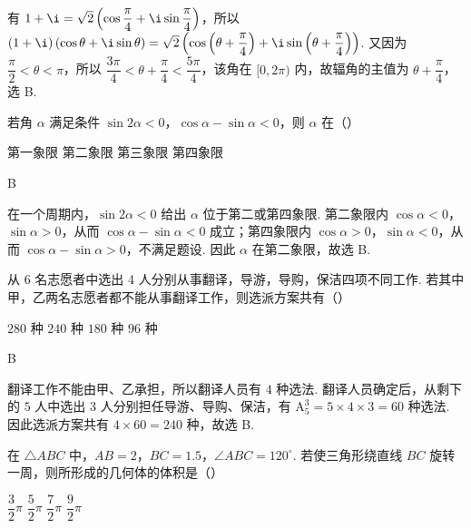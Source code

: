 \begin{solution}
有 \(1+\i=\sqrt{2}\left(\cos\dfrac{\pi}{4}+\i\sin\dfrac{\pi}{4}\right)\)，所以
\(\left(1+\i\right)\left(\cos\theta+\i\sin\theta\right)=\sqrt{2}\left(\cos\left(\theta+\dfrac{\pi}{4}\right)+\i\sin\left(\theta+\dfrac{\pi}{4}\right)\right)\).
又因为 \(\dfrac{\pi}{2}<\theta<\pi\)，所以 \(\dfrac{3\pi}{4}<\theta+\dfrac{\pi}{4}<\dfrac{5\pi}{4}\)，该角在 \([0,2\pi)\) 内，故辐角的主值为 \(\theta+\dfrac{\pi}{4}\)，选 B.
\end{solution}

\begin{problem}
若角 \(\alpha\) 满足条件 \(\sin2\alpha<0\)，\(\cos\alpha-\sin\alpha<0\)，则 \(\alpha\) 在（\quad）

\choices
    {第一象限}
    {第二象限}
    {第三象限}
    {第四象限}
\end{problem}

\begin{answer}
B
\end{answer}

\begin{solution}
在一个周期内，\(\sin2\alpha<0\) 给出 \(\alpha\) 位于第二或第四象限. 第二象限内 \(\cos\alpha<0\)，\(\sin\alpha>0\)，从而 \(\cos\alpha-\sin\alpha<0\) 成立；第四象限内 \(\cos\alpha>0\)，\(\sin\alpha<0\)，从而 \(\cos\alpha-\sin\alpha>0\)，不满足题设. 因此 \(\alpha\) 在第二象限，故选 B.
\end{solution}

\begin{problem}
从 6 名志愿者中选出 4 人分别从事翻译，导游，导购，保洁四项不同工作. 若其中甲，乙两名志愿者都不能从事翻译工作，则选派方案共有（\quad）

\choices
    {\(280\text{ 种}\)}
    {\(240\text{ 种}\)}
    {\(180\text{ 种}\)}
    {\(96\text{ 种}\)}
\end{problem}

\begin{answer}
B
\end{answer}

\begin{solution}
翻译工作不能由甲、乙承担，所以翻译人员有 \(4\) 种选法. 翻译人员确定后，从剩下的 \(5\) 人中选出 \(3\) 人分别担任导游、导购、保洁，有 \(\mathrm A_{5}^{3}=5\times4\times3=60\) 种选法. 因此选派方案共有 \(4\times60=240\) 种，故选 B.
\end{solution}

\begin{problem}
在 \(\triangle ABC\) 中，\(AB=2\)，\(BC=1.5\)，\(\angle ABC=120^{\circ}\). 若使三角形绕直线 \(BC\) 旋转一周，则所形成的几何体的体积是（\quad）

\choices
    {\(\dfrac{3}{2}\pi\)}
    {\(\dfrac{5}{2}\pi\)}
    {\(\dfrac{7}{2}\pi\)}
    {\(\dfrac{9}{2}\pi\)}
\end{problem}

